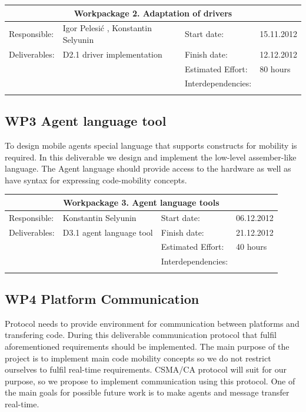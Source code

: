 \documentclass{scrreprt}
\begin{document}
\vspace{0.2in}
\begin{tabular}{|ll|ll|}
\hline \multicolumn{4}{|c|}{\textbf{Workpackage 2. Adaptation of drivers}}\\
\hline
Responsible:	&  Igor Pelesi\'c , Konstantin Selyunin	& Start date:		& 15.11.2012 \\
Deliverables:	&  D2.1 driver implementation		& Finish date:	 	& 12.12.2012\\
		&  					& Estimated Effort: 	& 80 hours \\
		&  					& Interdependencies:	& 	\\
		&  					& 			& 	\\
\hline
\end{tabular}


	\subsection{WP3 Agent language tool}

To design mobile agents special language that supports constructs for mobility is required.
In this deliverable we design and implement the low-level assember-like language.
The Agent language should provide access to the hardware as well as have syntax for expressing code-mobility concepts. 

\vspace{0.2in}
\begin{tabular}{|ll|ll|}
\hline \multicolumn{4}{|c|}{\textbf{Workpackage 3. Agent language tools }}\\
\hline
Responsible:	&  Konstantin Selyunin			& Start date:		& 06.12.2012 \\
Deliverables:	&  D3.1 agent language tool		& Finish date:	 	& 21.12.2012\\
		&  					& Estimated Effort: 	& 40 hours \\
		&  					& Interdependencies:	& 	\\
		&  					& 			& 	\\
\hline
\end{tabular}


	\subsection{WP4 Platform Communication}

Protocol needs to provide environment for communication between platforms and transfering code.
During this deliverable communication protocol that fulfil aforementioned requirements should be implemented.
The main purpose of the project is to implement main code mobility concepts
so we do not restrict ourselves to fulfil real-time requirements.
CSMA/CA protocol will suit for our purpose, so we propose to implement communication using this protocol.
One of the main goals for possible future work is to make agents and message transfer real-time.
\end{document}
